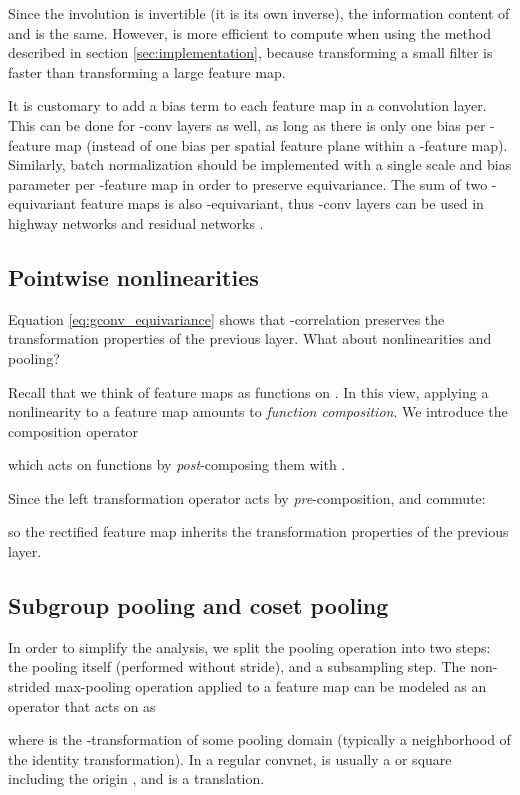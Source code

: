 \documentclass{article}
\begin{document}
Since the involution is invertible (it is its own inverse), the information content of  and  is the same.
However,  is more efficient to compute when using the method described in section \ref{sec:implementation}, because transforming a small filter is faster than transforming a large feature map.

It is customary to add a bias term to each feature map in a convolution layer.
This can be done for -conv layers as well, as long as there is only one bias per -feature map (instead of one bias per spatial feature plane within a -feature map).
Similarly, batch normalization \cite{Ioffe2015} should be implemented with a single scale and bias parameter per -feature map in order to preserve equivariance.
The sum of two -equivariant feature maps is also -equivariant, thus -conv layers can be used in highway networks and residual networks \cite{Srivastava2015a, He2015}.


\subsection{Pointwise nonlinearities}

Equation \ref{eq:gconv_equivariance} shows that -correlation preserves the transformation properties of the previous layer.
What about nonlinearities and pooling?

Recall that we think of feature maps as functions on .
In this view, applying a nonlinearity  to a feature map amounts to \emph{function composition}.
We introduce the composition operator

which acts on functions by \emph{post}-composing them with .

Since the left transformation operator  acts by \emph{pre}-composition,  and  commute:

so the rectified feature map inherits the transformation properties of the previous layer.


\subsection{Subgroup pooling and coset pooling}

In order to simplify the analysis, we split the pooling operation into two steps: the pooling itself (performed without stride), and a subsampling step.
The non-strided max-pooling operation applied to a feature map  can be modeled as an operator  that acts on  as

where  is the -transformation of some pooling domain  (typically a neighborhood of the identity transformation).
In a regular convnet,  is usually a  or  square including the origin , and  is a translation.
\end{document}
